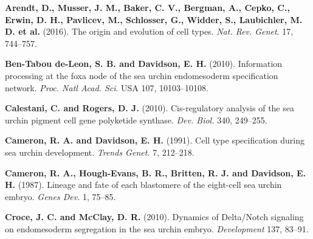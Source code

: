 \documentclass[vruler,JEB]{COB}%
\begin{document}





\begin{thebibliography}{}

\textbf{Arendt, D., Musser, J. M., Baker, C. V., Bergman, A., Cepko, C., Erwin, D. H.,
Pavlicev, M., Schlosser, G., Widder, S., Laubichler, M. D. et al.} (2016). The
origin and evolution of cell types. \textit{Nat. Rev. Genet}. 17, 744--757.

\textbf{Ben-Tabou de-Leon, S. B. and Davidson, E. H.} (2010). Information processing at
the foxa node of the sea urchin endomesoderm specification network. \textit{Proc. Natl
Acad. Sci}. USA 107, 10103--10108.

\textbf{Calestani, C. and Rogers, D. J.} (2010). Cis-regulatory analysis of the sea urchin
pigment cell gene polyketide synthase. \textit{Dev. Biol.} 340, 249--255.

\textbf{Cameron, R. A. and Davidson, E. H.} (1991). Cell type specification during sea
urchin development. \textit{Trends Genet.} 7, 212--218.

\textbf{Cameron, R. A., Hough-Evans, B. R., Britten, R. J. and Davidson, E. H.} (1987).
Lineage and fate of each blastomere of the eight-cell sea urchin embryo. \textit{Genes
Dev.} 1, 75--85.

\textbf{Croce, J. C. and McClay, D. R.} (2010). Dynamics of Delta/Notch signaling on
endomesoderm segregation in the sea urchin embryo. \textit{Development} 137, 83--91.

\end{thebibliography}
\end{document}
